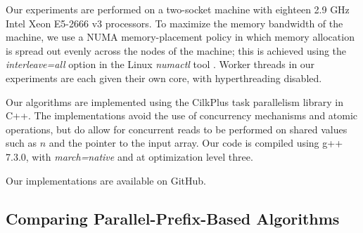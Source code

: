\documentclass[twoside,leqno,twocolumn]{article}
\newcommand{\defn}[1]{{\textit{\textbf{\boldmath #1}}}}
\renewcommand{\paragraph}[1]{\vspace{0.09in}\noindent{\bf \boldmath #1.}}
\begin{document}



\paragraph{Machine Details}
Our experiments are performed on a two-socket machine with eighteen
2.9 GHz Intel Xeon E5-2666 v3 processors. To maximize the memory
bandwidth of the machine, we use a NUMA memory-placement policy in
which memory allocation is spread out evenly across the nodes of the
machine; this is achieved using the \emph{interleave=all} option in
the Linux \emph{numactl} tool \cite{Kleen05}. Worker threads in our
experiments are each given their own core, with hyperthreading
disabled.

Our algorithms are implemented using the CilkPlus task parallelism
library in C++. The implementations avoid the use of concurrency
mechanisms and atomic operations, but do allow for concurrent reads to
be performed on shared values such as $n$ and the pointer to the input
array. Our code is compiled using g++ 7.3.0, with \emph{march=native}
and at optimization level three. 

Our implementations are available on GitHub.


\subsection{Comparing Parallel-Prefix-Based Algorithms}\label{subsecclassic}
\end{document}
